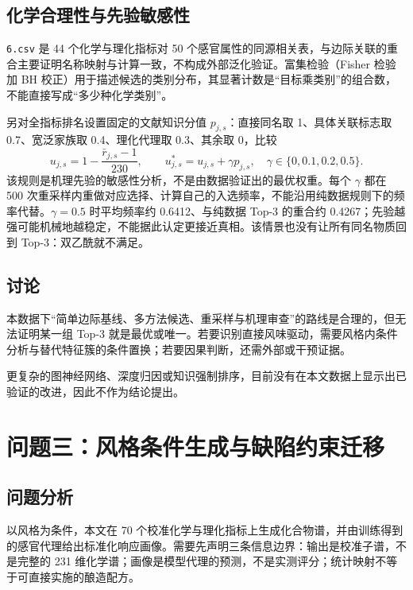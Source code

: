 \documentclass[UTF8,a4paper,zihao=-4]{ctexart}
\numberwithin{figure}{section}
\numberwithin{table}{section}
\numberwithin{equation}{section}
\newcommand{\file}[1]{\texttt{#1}}
\begin{document}
\subsection{化学合理性与先验敏感性}

\file{6.csv} 是 44 个化学与理化指标对 50 个感官属性的同源相关表，与边际关联的重合主要证明名称映射与计算一致，不构成外部泛化验证。富集检验（Fisher 检验加 BH 校正）用于描述候选的类别分布，其显著计数是“目标乘类别”的组合数，不能直接写成“多少种化学类别”。

另对全指标排名设置固定的文献知识分值 $p_{j,s}$：直接同名取 1、具体关联标志取 0.7、宽泛家族取 0.4、理化代理取 0.3、其余取 0，比较
\begin{equation}
u_{j,s}=1-\frac{\bar r_{j,s}-1}{230},\qquad u^{*}_{j,s}=u_{j,s}+\gamma p_{j,s},\quad\gamma\in\{0,0.1,0.2,0.5\}.
\label{eq:prior}
\end{equation}
该规则是机理先验的敏感性分析，不是由数据验证出的最优权重。每个 $\gamma$ 都在 500 次重采样内重做对应选择、计算自己的入选频率，不能沿用纯数据规则下的频率代替。$\gamma=0.5$ 时平均频率约 0.6412、与纯数据 Top-3 的重合约 0.4267；先验越强可能机械地越稳定，不能据此认定更接近真相。该情景也没有让所有同名物质回到 Top-3：双乙酰就不满足。

\subsection{讨论}

本数据下“简单边际基线、多方法候选、重采样与机理审查”的路线是合理的，但无法证明某一组 Top-3 就是最优或唯一。若要识别直接风味驱动，需要风格内条件分析与替代特征簇的条件置换；若要因果判断，还需外部或干预证据。

更复杂的图神经网络、深度归因或知识强制排序，目前没有在本文数据上显示出已验证的改进，因此不作为结论提出。

\section{问题三：风格条件生成与缺陷约束迁移}
\label{sec:q3}

\subsection{问题分析}

以风格为条件，本文在 70 个校准化学与理化指标上生成化合物谱，并由训练得到的感官代理给出标准化响应画像。需要先声明三条信息边界：输出是校准子谱，不是完整的 231 维化学谱；画像是模型代理的预测，不是实测评分；统计映射不等于可直接实施的酿造配方。
\end{document}
